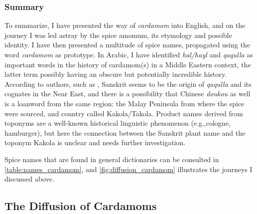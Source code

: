 

\subsubsection{Summary}

To summarize, I have presented the way of \textit{cardamom} into English, and on the journey I was led astray by the spice amomum, its etymology and possible identity. I have then presented a multitude of spice names, propagated using the word \textit{cardamom} as prototype. In Arabic, I have identified \textit{hal/hayl} and \textit{qaqulla} as important words in the history of cardamom(s) in a Middle Eastern context, the latter term possibly having an obscure but potentially incredible history. According to authors, such as \textcite{donkin_between_2003}, Sanskrit seems to be the origin of \textit{qaqulla} and its cognates in the Near East, and there is a possibility that Chinese \textit{doukou} as well is a loanword from the same region: the Malay Peninsula from where the spice were sourced, and country called Kakola/Takola. Product names derived from toponyms are a well-known historical linguistic phenomenon (e.g.,cologne, hamburger), but here the connection between the Sanskrit plant name and the toponym Kakola is unclear and needs further investigation.

Spice names that are found in general dictionaries can be consulted in \cref{table:names_cardamom}, and \cref{fig:diffusion_cardamom} illustrates the journeys I discussed above. 



\subsection{The Diffusion of Cardamoms}

